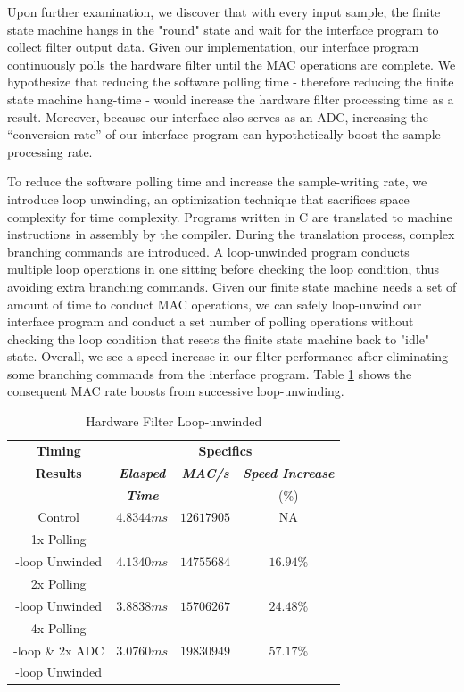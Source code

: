 \documentclass[conference]{IEEEtran}
\begin{document}
Upon further examination, we discover that with every input sample, the finite state machine hangs in the "round" state and wait for the interface program to collect filter output data. Given our implementation, our interface program continuously polls the hardware filter until the MAC operations are complete. We hypothesize that reducing the software polling time - therefore reducing the finite state machine hang-time - would increase the hardware filter processing time as a result. Moreover, because our interface also serves as an ADC, increasing the ``conversion rate'' of our interface program can hypothetically boost the sample processing rate.

To reduce the software polling time and increase the sample-writing rate, we introduce loop unwinding, an optimization technique that sacrifices space complexity for time complexity. Programs written in C are translated to machine instructions in assembly by the compiler. During the translation process, complex branching commands are introduced. A loop-unwinded program conducts multiple loop operations in one sitting before checking the loop condition, thus avoiding extra branching commands. Given our finite state machine needs a set of amount of time to conduct MAC operations, we can safely loop-unwind our interface program and conduct a set number of polling operations without checking the loop condition that resets the finite state machine back to "idle" state. Overall, we see a speed increase in our filter performance after eliminating some branching commands from the interface program. Table \ref{loop_unwind} shows the consequent MAC rate boosts from successive loop-unwinding.

\begin{table}[htbp]
\caption{Hardware Filter Loop-unwinded}
\begin{center}
\begin{tabular}{|c|c|c|c|}
\hline
\textbf{Timing}&\multicolumn{3}{|c|}{\textbf{Specifics}} \\
\cline{2-4} 
\textbf{Results} & \textbf{\textit{Elasped}} & \textbf{\textit{MAC/s}}& \textbf{\textit{Speed Increase}}\\
 & \textbf{\textit{Time}} & & (\%)\\
\hline
Control & $4.8344ms$ & $12617905$ & NA\\
\hline
1x Polling & & &\\
-loop Unwinded & $4.1340ms$ & $14755684$ & $16.94\%$\\
\hline
2x Polling & & &\\
-loop Unwinded & $3.8838ms$ & $15706267$ & $24.48\%$ \\
\hline
4x Polling & & &\\
-loop \& 2x ADC & $3.0760ms$ & $19830949$ & $57.17\%$\\
-loop Unwinded & & & \\
\hline
\end{tabular}
\label{loop_unwind}
\end{center}
\end{table}
\end{document}
